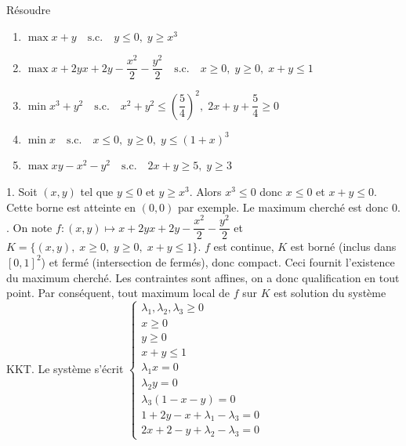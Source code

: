\documentclass{fancybook}
\begin{document}
\begin{exercice}
Résoudre
\begin{enumerate}
\item $\max x+y \quad \text{s.c.} \quad y\leq 0,\; y\geq x^3 $
\item $\max x + 2yx + 2y -\dfrac{x^2}2 - \dfrac{y^2}{2}\quad \text{s.c.} \quad x\geq 0,\; y\geq 0,\; x+y\leq 1 $ 
\item $\min x^3+y^2 \quad \text{s.c.} \quad x^2+y^2\leq \left(\dfrac{5}{4}\right)^2,\; 2x+y+\dfrac{5}{4}\geq 0$
\item $\min x \quad \text{s.c.} \quad x\leq 0,\; y\geq 0,\; y\leq (1+x)^3 $
\item $\max xy-x^2-y^2 \quad \text{s.c.} \quad 2x+y\geq 5, \; y\geq 3$
\end{enumerate}
\end{exercice}
1. Soit $(x,y)$ tel que $y\leq 0$ et $y\geq x^3$. Alors $x^3\leq 0$ donc $x\leq 0$ et $x+y\leq 0$. Cette borne est atteinte en $(0,0)$ par exemple. Le maximum cherché est donc $0$.\newline
{}. On note $f:(x,y)\mapsto x + 2yx + 2y -\dfrac{x^2}2 - \dfrac{y^2}{2}$ et $K=\{(x,y),\;x\geq 0,\; y\geq 0,\; x+y\leq 1\}$. $f$ est continue, $K$ est borné (inclus dans $[0,1]^2$) et fermé (intersection de fermés), donc compact. Ceci fournit l'existence du maximum cherché.\newline
Les contraintes sont affines, on a donc qualification en tout point. Par conséquent, tout maximum local de $f$ sur $K$ est solution du système KKT.\newline
Le système s'écrit $\begin{cases}
\lambda_1,\lambda_2,\lambda_3\geq 0 \\
x\geq 0\\
y\geq 0 \\
x+y\leq 1\\
\lambda_1 x =0\\
\lambda_2 y=0\\
\lambda_3 (1-x-y) = 0\\
1+2y-x+\lambda_1-\lambda_3 = 0\\
2x+2-y+\lambda_2-\lambda_3 = 0
\end{cases}$\newline
\end{document}
